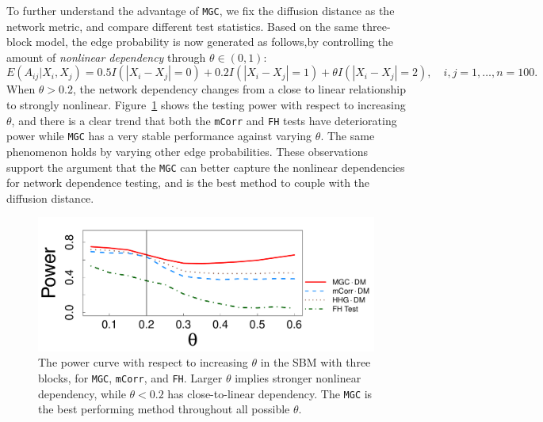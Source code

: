 \documentclass[11pt]{article}
\theoremstyle{definition}
\begin{document}
To further understand the advantage of \texttt{MGC}, we fix the diffusion distance as the network metric, and compare different test statistics. Based on the same three-block model, the edge probability is now generated as follows,by controlling the amount of \textit{nonlinear dependency} through $\theta \in (0, 1)$:
\begin{equation}
E(A_{ij} | X_{i}, X_{j}) = 0.5 I(|X_{i} - X_{j}| = 0) + 0.2 I(|X_{i} - X_{j}| = 1) + \theta I(|X_{i} - X_{j}| = 2), \quad i,j = 1, \ldots, n = 100.
\label{eq:mono}
\end{equation}
When $\theta > 0.2$, the network dependency changes from a close to linear relationship to strongly nonlinear. Figure~\ref{fig:powerplot} shows the testing power with respect to increasing $\theta$, and there is a clear trend that both the \texttt{mCorr} and \texttt{FH} tests have deteriorating power while \texttt{MGC} has a very stable performance against varying $\theta$. The same phenomenon holds by varying other edge probabilities. These observations support the argument that the \texttt{MGC} can better capture the nonlinear dependencies for network dependence testing, and is the best method to couple with the diffusion distance.
\begin{figure}[ht]
	\centering
	\includegraphics[width=0.7\linewidth]{mono.pdf}
	\caption{The power curve with respect to increasing $\theta$ in the SBM with three blocks, for \texttt{MGC}, \texttt{mCorr}, and \texttt{FH}. Larger $\theta$ implies stronger nonlinear dependency, while $\theta<0.2$ has close-to-linear dependency. The \texttt{MGC} is the best performing method throughout all possible $\theta$.} 
	\label{fig:powerplot}
\end{figure}
\end{document}
